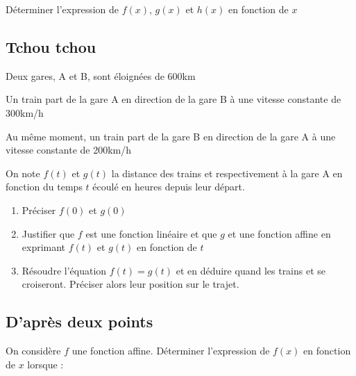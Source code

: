 \documentclass[oneside,12pt]{article}          %
\begin{document}
\begin{minipage}{0.33\linewidth}
\end{minipage}

Déterminer l'expression de $f(x)$, $g(x)$ et $h(x)$ en fonction de $x$



\subsection{Tchou tchou}
Deux gares, A et B, sont éloignées de 600km

Un train  part de la gare A en direction de la gare B à une vitesse constante de 300km/h

Au même moment, un train  part de la gare B en direction de la gare A à une vitesse constante de 200km/h

On note $f(t)$ et $g(t)$ la distance des trains  et  respectivement à la gare A en fonction du temps $t$ écoulé en heures depuis leur départ.
\begin{enumerate}
	\item Préciser $f(0)$ et $g(0)$
	\item Justifier que $f$ est une fonction linéaire et que $g$ et une fonction affine en exprimant $f(t)$ et $g(t)$ en fonction de $t$
	\item Résoudre l'équation $f(t)=g(t)$ et en déduire quand les trains  et  se croiseront. Préciser alors leur position sur le trajet.
\end{enumerate}



\subsection{D'après deux points}
On considère $f$ une fonction affine. Déterminer l'expression de $f(x)$ en fonction de $x$ lorsque :
\end{document}

